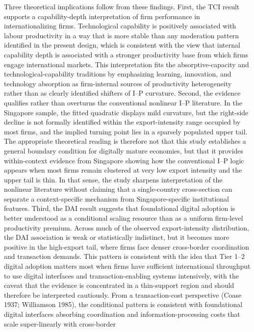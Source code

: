 \documentclass[12pt,a4paper]{article}
\begin{document}
Three theoretical implications follow from these findings. First, the
TCI result supports a capability-depth interpretation of firm
performance in internationalizing firms. Technological capability is
positively associated with labour productivity in a way that is more
stable than any moderation pattern identified in the present design,
which is consistent with the view that internal capability depth is
associated with a stronger productivity base from which firms engage
international markets. This interpretation fits the absorptive-capacity
and technological-capability traditions by emphasizing learning,
innovation, and technology absorption as firm-internal sources of
productivity heterogeneity rather than as clearly identified shifters of
I--P curvature. Second, the evidence qualifies rather than overturns the
conventional nonlinear I--P literature. In the Singapore sample, the
fitted quadratic displays mild curvature, but the right-side decline is
not formally identified within the export-intensity range occupied by
most firms, and the implied turning point lies in a sparsely populated
upper tail. The appropriate theoretical reading is therefore not that
this study establishes a general boundary condition for digitally mature
economies, but that it provides within-context evidence from Singapore
showing how the conventional I--P logic appears when most firms remain
clustered at very low export intensity and the upper tail is thin. In
that sense, the study sharpens interpretation of the nonlinear
literature without claiming that a single-country cross-section can
separate a context-specific mechanism from Singapore-specific
institutional features. Third, the DAI result suggests that foundational
digital adoption is better understood as a conditional scaling resource
than as a uniform firm-level productivity premium. Across much of the
observed export-intensity distribution, the DAI association is weak or
statistically indistinct, but it becomes more positive in the
high-export tail, where firms face denser cross-border coordination and
transaction demands. This pattern is consistent with the idea that Tier
1--2 digital adoption matters most when firms have sufficient
international throughput to use digital interfaces and
transaction-enabling systems intensively, with the caveat that the
evidence is concentrated in a thin-support region and should therefore
be interpreted cautiously. From a transaction-cost perspective (Coase
1937; Williamson 1985), the conditional pattern is consistent with
foundational digital interfaces absorbing coordination and
information-processing costs that scale super-linearly with cross-border
\end{document}
